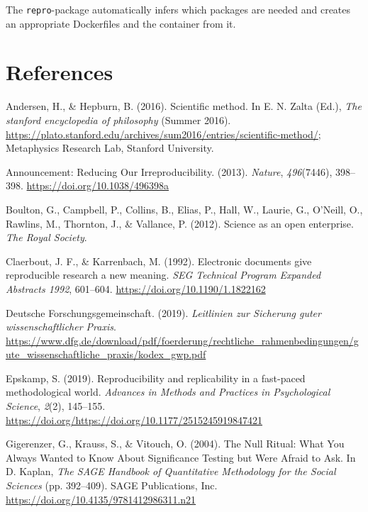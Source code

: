 \documentclass[12pt,a4paper,]{article}
\begin{document}
The \texttt{repro}-package automatically infers which packages are needed and creates an appropriate Dockerfiles and the container from it.

\hypertarget{references}{%
\section*{References}\label{references}}

\hypertarget{refs}{}
\leavevmode\hypertarget{ref-andersonScientificMethod2016}{}%
Andersen, H., \& Hepburn, B. (2016). Scientific method. In E. N. Zalta (Ed.), \emph{The stanford encyclopedia of philosophy} (Summer 2016). \url{https://plato.stanford.edu/archives/sum2016/entries/scientific-method/}; Metaphysics Research Lab, Stanford University.

\leavevmode\hypertarget{ref-AnnouncementReducingOur2013}{}%
Announcement: Reducing Our Irreproducibility. (2013). \emph{Nature}, \emph{496}(7446), 398--398. \url{https://doi.org/10.1038/496398a}

\leavevmode\hypertarget{ref-boultonScienceOpenEnterprise2012}{}%
Boulton, G., Campbell, P., Collins, B., Elias, P., Hall, W., Laurie, G., O'Neill, O., Rawlins, M., Thornton, J., \& Vallance, P. (2012). Science as an open enterprise. \emph{The Royal Society}.

\leavevmode\hypertarget{ref-claerboutElectronicDocumentsGive1992}{}%
Claerbout, J. F., \& Karrenbach, M. (1992). Electronic documents give reproducible research a new meaning. \emph{SEG Technical Program Expanded Abstracts 1992}, 601--604. \url{https://doi.org/10.1190/1.1822162}

\leavevmode\hypertarget{ref-dfg2019}{}%
Deutsche Forschungsgemeinschaft. (2019). \emph{Leitlinien zur Sicherung guter wissenschaftlicher Praxis}. \url{https://www.dfg.de/download/pdf/foerderung/rechtliche_rahmenbedingungen/gute_wissenschaftliche_praxis/kodex_gwp.pdf}

\leavevmode\hypertarget{ref-epskamp2019rep}{}%
Epskamp, S. (2019). Reproducibility and replicability in a fast-paced methodological world. \emph{Advances in Methods and Practices in Psychological Science}, \emph{2}(2), 145--155. \url{https://doi.org/https://doi.org/10.1177/2515245919847421}

\leavevmode\hypertarget{ref-gigerenzerNullRitualWhat2004}{}%
Gigerenzer, G., Krauss, S., \& Vitouch, O. (2004). The Null Ritual: What You Always Wanted to Know About Significance Testing but Were Afraid to Ask. In D. Kaplan, \emph{The SAGE Handbook of Quantitative Methodology for the Social Sciences} (pp. 392--409). SAGE Publications, Inc. \url{https://doi.org/10.4135/9781412986311.n21}
\end{document}
